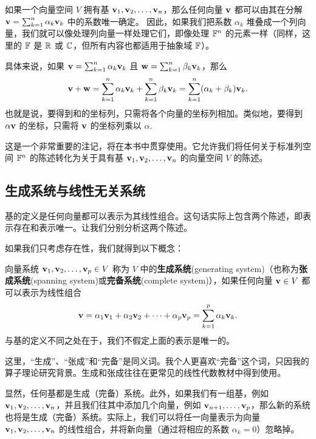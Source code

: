 \begin{remark}\label{stmt:01-02-04}
如果一个向量空间 $V$ 拥有基 $\mathbf{v}_1, \mathbf{v}_2, \dots, \mathbf{v}_n$，那么任何向量 $\mathbf{v}$ 都可以由其在分解 $\mathbf{v} = \sum_{k=1}^n \alpha_k \mathbf{v}_k$ 中的系数唯一确定。
因此，如果我们把系数 $\alpha_k$ 堆叠成一个列向量，我们就可以像处理列向量一样处理它们，即像处理 $\mathbb{F}^n$ 的元素一样（同样，这里的 $\mathbb{F}$ 是 $\mathbb{R}$ 或 $\mathbb{C}$，但所有内容也都适用于抽象域 $\mathbb{F}$）。

具体来说，如果 $\mathbf{v} = \sum_{k=1}^n \alpha_k \mathbf{v}_k$ 且 $\mathbf{w} = \sum_{k=1}^n \beta_k \mathbf{v}_k$，那么
$$ \mathbf{v} + \mathbf{w} = \sum_{k=1}^n \alpha_k \mathbf{v}_k + \sum_{k=1}^n \beta_k \mathbf{v}_k = \sum_{k=1}^n (\alpha_k + \beta_k) \mathbf{v}_k. $$
也就是说，要得到和的坐标列，只需将各个向量的坐标列相加。类似地，要得到 $\alpha \mathbf{v}$ 的坐标，只需将 $\mathbf{v}$ 的坐标列乘以 $\alpha$.~

这是一个非常重要的注记，将在本书中贯穿使用。它允许我们将任何关于标准列空间 $\mathbb{F}^n$ 的陈述转化为关于具有基 $\mathbf{v}_1, \mathbf{v}_2, \dots, \mathbf{v}_n$ 的向量空间 $V$ 的陈述。
\end{remark}



\subsection{生成系统与线性无关系统}\label{sec:01-02-01}
基的定义是任何向量都可以表示为其线性组合。这句话实际上包含两个陈述，即表示存在和表示唯一。让我们分别分析这两个陈述。

如果我们只考虑存在性，我们就得到以下概念：

\begin{definition}\label{stmt:01-02-05}
向量系统 $\mathbf{v}_1, \mathbf{v}_2, \dots, \mathbf{v}_p \in V$ 称为 $V$ 中的\textbf{生成系统}(generating system)（也称为\textbf{张成系统}(spanning system)或\textbf{完备系统}(complete system)），如果任何向量 $\mathbf{v} \in V$ 都可以表示为线性组合
$$
\mathbf{v} = \alpha_1 \mathbf{v}_1 + \alpha_2 \mathbf{v}_2 + \dots + \alpha_p \mathbf{v}_p = \sum_{k=1}^p \alpha_k \mathbf{v}_k.
$$
与基的定义不同之处在于，我们不假定上面的表示是唯一的。
\end{definition}


这里，“生成”、“张成”和“完备”是同义词。我个人更喜欢“完备”这个词，只因我的算子理论研究背景。生成和张成往往在更常见的线性代数教材中得到使用。

显然，任何基都是生成（完备）系统。此外，如果我们有一组基，例如 $\mathbf{v}_1, \mathbf{v}_2, \dots, \mathbf{v}_n$，并且我们往其中添加几个向量，例如 $\mathbf{v}_{n+1}, \dots, \mathbf{v}_p$，那么新的系统也将是生成（完备）系统。实际上，我们可以将任一向量表示为向量 $\mathbf{v}_1, \mathbf{v}_2, \dots, \mathbf{v}_n$ 的线性组合，并将新向量（通过将相应的系数 $\alpha_k = 0$）忽略掉。

